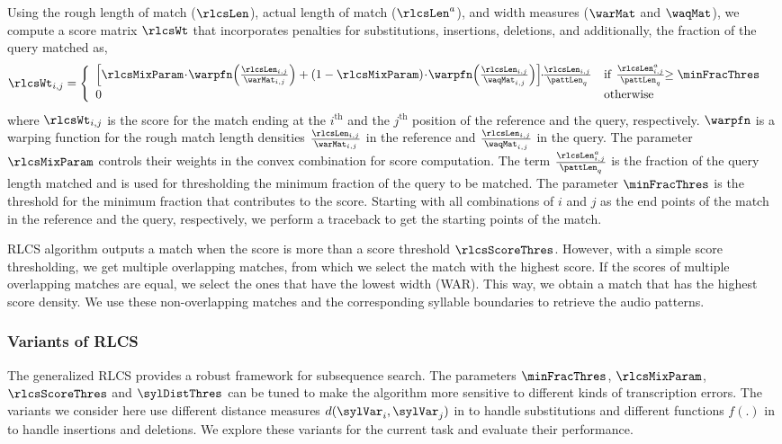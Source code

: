 Using the rough length of match ($\rlcsLen$), actual length of match ($\rlcsLen^a$), and width measures ($\warMat$ and $\waqMat$), we compute a score matrix $\rlcsWt$ that incorporates penalties for substitutions, insertions, deletions, and additionally, the fraction of the query matched as, 
\begin{equation}\label{eq:rlcs:score}
\rlcsWt_{i,j} = 
\begin{cases}
\begin{array}{ll}
\left[\rlcsMixParam\!\cdot\!\warpfn\!\left(\frac{\rlcsLen_{i,j}}{\warMat_{i,j}}\right) + (1-\rlcsMixParam)\!\cdot\!\warpfn\!\left(\frac{\rlcsLen_{i,j}}{\waqMat_{i,j}}\right)\right]\!\!\cdot\!\!\frac{\rlcsLen_{i,j}}{\pattLen_q} & \mathrm{if}\,\,\frac{\rlcsLen^{a}_{i,j}}{\pattLen_q}\!\!\geq\minFracThres\\ 0 & \mathrm{otherwise}
\end{array}\end{cases}
\end{equation}
where $\rlcsWt_{i,j}$ is the score for the match ending at the $i^\mathrm{th}$ and the $j^\mathrm{th}$ position of the reference and the query, respectively. $\warpfn$ is a warping function for the rough match length densities $\frac{\rlcsLen_{i,j}}{\warMat_{i,j}}$ in the reference and $\frac{\rlcsLen_{i,j}}{\waqMat_{i,j}}$ in the query. The parameter $\rlcsMixParam$ controls their weights in the convex combination for score computation. The term $\frac{\rlcsLen_{i,j}^{a}}{\pattLen_q}$ is the fraction of the query length matched and is used for thresholding the minimum fraction of the query to be matched. The parameter $\minFracThres$ is the threshold for the minimum fraction that contributes to the score. Starting with all combinations of $i$ and $j$ as the end points of the match in the reference and the query, respectively, we perform a traceback to get the starting points of the match.

\gls{RLCS} algorithm outputs a match when the score is more than a score threshold $\rlcsScoreThres$. However, with a simple score thresholding, we get multiple overlapping matches, from which we select the match with the highest score. If the scores of multiple overlapping matches are equal, we select the ones that have the lowest width (\gls{WAR}). This way, we obtain a match that has the highest score density. We use these non-overlapping matches and the corresponding syllable boundaries to retrieve the audio patterns.
%
\subsubsection{Variants of \gls{RLCS}}
The generalized \gls{RLCS} provides a robust framework for subsequence search. The parameters $\minFracThres$, $\rlcsMixParam$, $\rlcsScoreThres$ and $\sylDistThres$ can be tuned to make the algorithm more sensitive to different kinds of transcription errors. The variants we consider here use different distance measures $d(\sylVar_i,\sylVar_j)$ in  to handle substitutions and different functions $f(.)$ in  to handle insertions and deletions. We explore these variants for the current task and evaluate their performance.

